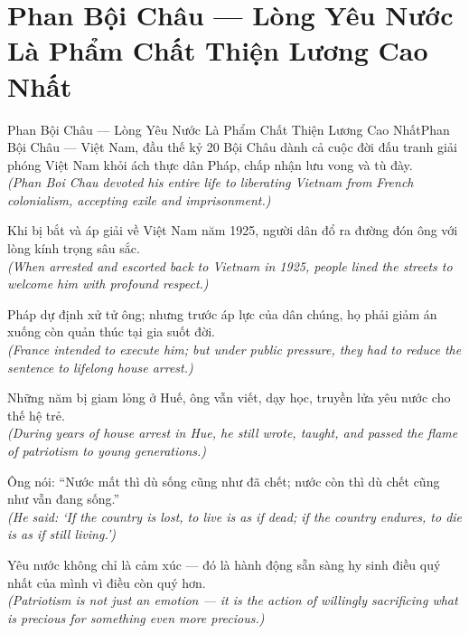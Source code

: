 \section{Phan Bội Châu --- Lòng Yêu Nước Là Phẩm Chất Thiện Lương Cao Nhất}
\begin{truyen}{Phan Bội Châu --- Lòng Yêu Nước Là Phẩm Chất Thiện Lương Cao Nhất}{Phan Bội Châu --- Việt Nam, đầu thế kỷ 20}
 Bội Châu dành cả cuộc đời đấu tranh giải phóng Việt Nam khỏi ách thực dân Pháp, chấp nhận lưu vong và tù đày.\\[4pt]
\textit{(Phan Boi Chau devoted his entire life to liberating Vietnam from French colonialism, accepting exile and imprisonment.)}

Khi bị bắt và áp giải về Việt Nam năm 1925, người dân đổ ra đường đón ông với lòng kính trọng sâu sắc.\\[4pt]
\textit{(When arrested and escorted back to Vietnam in 1925, people lined the streets to welcome him with profound respect.)}

Pháp dự định xử tử ông; nhưng trước áp lực của dân chúng, họ phải giảm án xuống còn quản thúc tại gia suốt đời.\\[4pt]
\textit{(France intended to execute him; but under public pressure, they had to reduce the sentence to lifelong house arrest.)}

Những năm bị giam lỏng ở Huế, ông vẫn viết, dạy học, truyền lửa yêu nước cho thế hệ trẻ.\\[4pt]
\textit{(During years of house arrest in Hue, he still wrote, taught, and passed the flame of patriotism to young generations.)}

Ông nói: ``Nước mất thì dù sống cũng như đã chết; nước còn thì dù chết cũng như vẫn đang sống.''\\[4pt]
\textit{(He said: `If the country is lost, to live is as if dead; if the country endures, to die is as if still living.')}

\end{truyen}
\begin{baihoc}
  Yêu nước không chỉ là cảm xúc --- đó là hành động sẵn sàng hy sinh điều quý nhất của mình vì điều còn quý hơn.\\[4pt]
  \textit{(Patriotism is not just an emotion --- it is the action of willingly sacrificing what is precious for something even more precious.)}
\end{baihoc}
